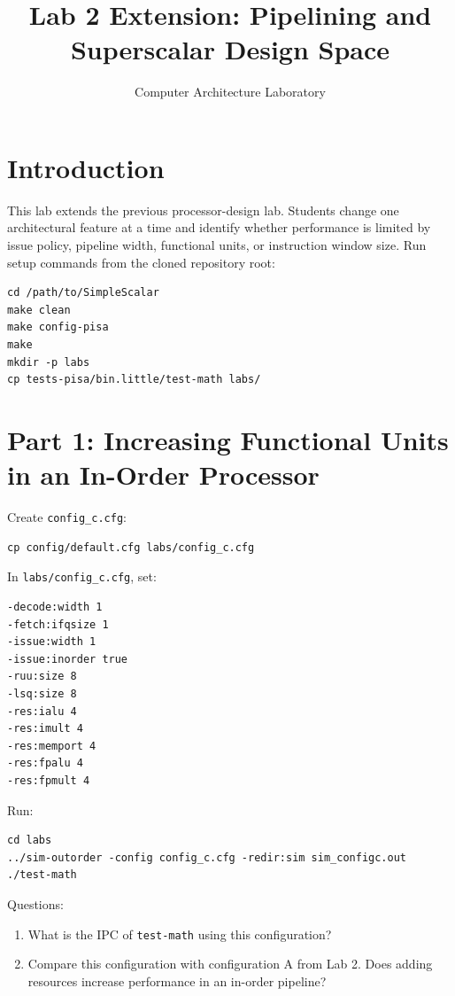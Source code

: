 \documentclass[11pt]{article}
\title{Lab 2 Extension: Pipelining and Superscalar Design Space}
\author{Computer Architecture Laboratory}
\date{}
\begin{document}
\maketitle
\section{Introduction}
This lab extends the previous processor-design lab. Students change one architectural feature at a time and identify whether performance is limited by issue policy, pipeline width, functional units, or instruction window size.
Run setup commands from the cloned repository root:
\begin{lstlisting}
cd /path/to/SimpleScalar
make clean
make config-pisa
make
mkdir -p labs
cp tests-pisa/bin.little/test-math labs/
\end{lstlisting}
\section{Part 1: Increasing Functional Units in an In-Order Processor}
Create \texttt{config\_c.cfg}:
\begin{lstlisting}
cp config/default.cfg labs/config_c.cfg
\end{lstlisting}
In \texttt{labs/config\_c.cfg}, set:
\begin{lstlisting}
-decode:width 1
-fetch:ifqsize 1
-issue:width 1
-issue:inorder true
-ruu:size 8
-lsq:size 8
-res:ialu 4
-res:imult 4
-res:memport 4
-res:fpalu 4
-res:fpmult 4
\end{lstlisting}
Run:
\begin{lstlisting}
cd labs
../sim-outorder -config config_c.cfg -redir:sim sim_configc.out ./test-math
\end{lstlisting}
Questions:
\begin{enumerate}
\item What is the IPC of \texttt{test-math} using this configuration?
\item Compare this configuration with configuration A from Lab 2. Does adding resources increase performance in an in-order pipeline?
\end{enumerate}
\end{document}
